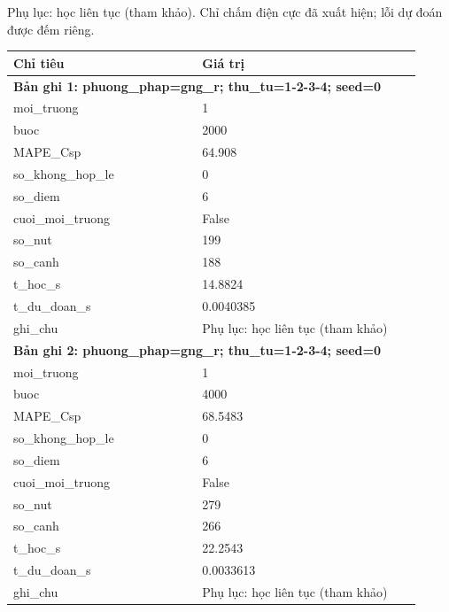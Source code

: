 \par\smallskip\noindent Phụ lục: học liên tục (tham khảo). Chỉ chấm điện cực đã xuất hiện; lỗi dự đoán được đếm riêng.\par
\begin{longtable}{p{0.43\linewidth}p{0.50\linewidth}}
\toprule Chỉ tiêu & Giá trị \\ \midrule \endhead
\multicolumn{2}{p{0.95\linewidth}}{\textbf{Bản ghi 1: phuong\_phap=gng\_r; thu\_tu=1-2-3-4; seed=0}} \\
moi\_\allowbreak truong & 1 \\
buoc & 2000 \\
MAPE\_\allowbreak Csp & 64.908 \\
so\_\allowbreak khong\_\allowbreak hop\_\allowbreak le & 0 \\
so\_\allowbreak diem & 6 \\
cuoi\_\allowbreak moi\_\allowbreak truong & False \\
so\_\allowbreak nut & 199 \\
so\_\allowbreak canh & 188 \\
t\_\allowbreak hoc\_\allowbreak s & 14.8824 \\
t\_\allowbreak du\_\allowbreak doan\_\allowbreak s & 0.0040385 \\
ghi\_\allowbreak chu & Phụ lục: học liên tục (tham khảo) \\
\midrule
\multicolumn{2}{p{0.95\linewidth}}{\textbf{Bản ghi 2: phuong\_phap=gng\_r; thu\_tu=1-2-3-4; seed=0}} \\
moi\_\allowbreak truong & 1 \\
buoc & 4000 \\
MAPE\_\allowbreak Csp & 68.5483 \\
so\_\allowbreak khong\_\allowbreak hop\_\allowbreak le & 0 \\
so\_\allowbreak diem & 6 \\
cuoi\_\allowbreak moi\_\allowbreak truong & False \\
so\_\allowbreak nut & 279 \\
so\_\allowbreak canh & 266 \\
t\_\allowbreak hoc\_\allowbreak s & 22.2543 \\
t\_\allowbreak du\_\allowbreak doan\_\allowbreak s & 0.0033613 \\
ghi\_\allowbreak chu & Phụ lục: học liên tục (tham khảo) \\

\end{longtable}
